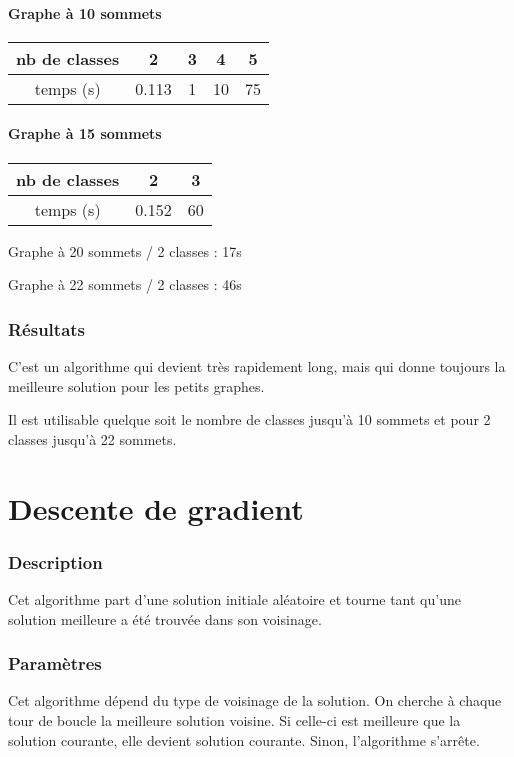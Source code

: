 \documentclass[12pt]{article}
\begin{document}
\subsection{Graphe à 10 sommets}

\begin{tabular}{|c|c|c|c|c|}
	\hline 
	nb de classes & 2 & 3 & 4 & 5 \\
	\hline
	temps (s) & 0.113 & 1 & 10 & 75 \\
	\hline
\end{tabular}

\subsection{Graphe à 15 sommets}

\begin{tabular}{|c|c|c |}
	\hline 
	nb de classes & 2 & 3 \\
	\hline
	temps (s) & 0.152 & 60 \\
	\hline
\end{tabular}

\bigskip
Graphe à 20 sommets / 2 classes : 17s

Graphe à 22 sommets / 2 classes : 46s

\section{Résultats}
C'est un algorithme qui devient très rapidement long, mais qui donne toujours la meilleure solution pour les petits graphes.

Il est utilisable quelque soit le nombre de classes jusqu’à 10 sommets et pour 2 classes jusqu’à 22 sommets.

\newpage

\part{Descente de gradient}
\section{Description}
Cet algorithme part d’une solution initiale aléatoire et tourne tant qu’une solution meilleure a été trouvée dans son voisinage.

\section{Paramètres}
Cet algorithme dépend du type de voisinage de la solution. On cherche à chaque tour de boucle la meilleure solution voisine. Si celle-ci est meilleure que la solution courante, elle devient solution courante. Sinon, l’algorithme s’arrête.
\end{document}
